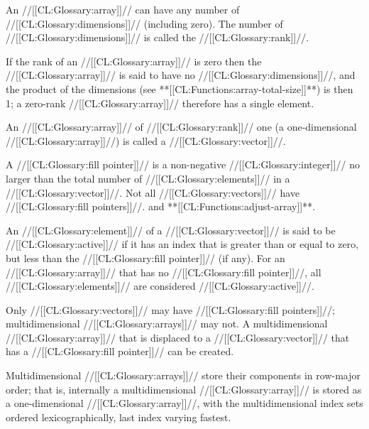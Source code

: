 An //[[CL:Glossary:array]]// can have any number of //[[CL:Glossary:dimensions]]// (including zero). The number of //[[CL:Glossary:dimensions]]// is called the //[[CL:Glossary:rank]]//.

If the rank of an //[[CL:Glossary:array]]// is zero then the //[[CL:Glossary:array]]// is said to have no //[[CL:Glossary:dimensions]]//, and the product of the dimensions (see **[[CL:Functions:array-total-size]]**) is then 1; a zero-rank //[[CL:Glossary:array]]// therefore has a single element.


An //[[CL:Glossary:array]]// of //[[CL:Glossary:rank]]// one (\ie a one-dimensional //[[CL:Glossary:array]]//) is called a //[[CL:Glossary:vector]]//.


A //[[CL:Glossary:fill pointer]]// is a non-negative //[[CL:Glossary:integer]]// no larger than the total number of //[[CL:Glossary:elements]]// in a //[[CL:Glossary:vector]]//. Not all //[[CL:Glossary:vectors]]// have //[[CL:Glossary:fill pointers]]//.  and **[[CL:Functions:adjust-array]]**.

An //[[CL:Glossary:element]]// of a //[[CL:Glossary:vector]]// is said to be //[[CL:Glossary:active]]// if it has an index that is greater than or equal to zero,  but less than the //[[CL:Glossary:fill pointer]]// (if any). For an //[[CL:Glossary:array]]// that has no //[[CL:Glossary:fill pointer]]//, all //[[CL:Glossary:elements]]// are considered //[[CL:Glossary:active]]//.

Only //[[CL:Glossary:vectors]]// may have //[[CL:Glossary:fill pointers]]//;  multidimensional //[[CL:Glossary:arrays]]// may not. A multidimensional //[[CL:Glossary:array]]// that is displaced to a //[[CL:Glossary:vector]]//  that has a //[[CL:Glossary:fill pointer]]// can be created.

\endsubsubsubsubsection%

\endsubsubsubsection%



Multidimensional //[[CL:Glossary:arrays]]// store their components in row-major order; that is, internally a multidimensional //[[CL:Glossary:array]]// is stored as a one-dimensional //[[CL:Glossary:array]]//, with the multidimensional index sets ordered lexicographically, last index varying fastest.  
  \endsubsubsubsubsection%

